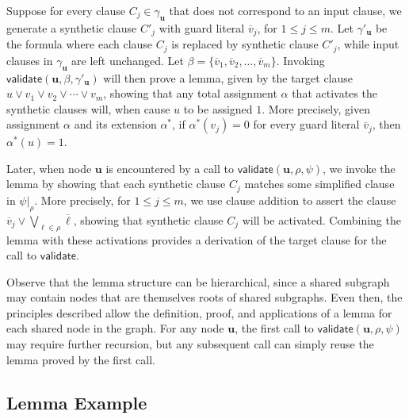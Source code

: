 \documentclass[twoside,11pt]{article}
\newcommand{\obar}[1]{\overline{#1}}
\newcommand{\lit}{\ell}
\newcommand{\extend}[1]{#1^{*}}
\newcommand{\assign}{\alpha}
\newcommand{\eassign}{\extend{\alpha}}
\newcommand{\passign}{\rho}
\newcommand{\lassign}{\beta}
\newcommand{\validate}{\textsf{validate}}
\newcommand{\makenode}[1]{\mathbf{#1}}
\newcommand{\nodeu}{\makenode{u}}
\newcommand{\simplify}[2]{#1|_{#2}}
\begin{document}
Suppose for every clause $C_j \in \gamma_{\nodeu}$ that does not correspond to
an input clause, we generate a synthetic clause $C'_j$ with guard literal
$\obar{v}_j$, for $1 \leq j \leq m$.  Let $\gamma'_{\nodeu}$ be the formula where each clause $C_j$ is replaced by synthetic clause $C'_j$,
while input clauses in $\gamma_{\nodeu}$ are left unchanged.
Let $\lassign = \{ \obar{v}_1, \obar{v}_2, \ldots, \obar{v}_m \}$.
Invoking $\validate(\nodeu, \lassign, \gamma'_{\nodeu})$
 will then prove a lemma, given by the target clause
 $u \lor v_1 \lor v_2 \lor \cdots \lor v_m$,
 showing that any total assignment $\assign$ that activates the synthetic clauses will, when cause $u$ to be assigned $1$.
 More precisely, given assignment $\assign$ and its extension $\eassign$, if $\eassign(v_j) = 0$ for every guard literal $\obar{v}_j$, then $\eassign(u) = 1$.

Later, when node $\nodeu$ is encountered by a call to $\validate(\nodeu, \passign, \psi)$, we invoke the lemma
by showing that each synthetic clause
$C_j$ matches some simplified clause in $\simplify{\psi}{\passign}$.  More precisely,
for $1 \leq j \leq m$,
we use clause addition to assert the clause
$\obar{v}_j \lor \bigvee_{\lit \in \passign} \obar{\lit}$,
showing that synthetic clause $C_j$ will be activated.
Combining the lemma with these activations provides a derivation of the target clause for the call to $\validate$.

Observe that the lemma structure can be hierarchical, since a shared
subgraph may contain nodes that are themselves roots of shared
subgraphs.  Even then, the principles described allow the
definition, proof, and applications of a lemma for each shared node in
the graph.  For any node $\nodeu$, the first call to
$\validate(\nodeu, \passign, \psi)$ may require further recursion,
but any subsequent call can simply reuse the lemma proved by the first call.

\subsection{Lemma Example}
\label{app:lemma:eg}
\end{document}
